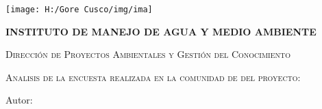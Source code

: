 \begin{titlepage}
	\centering
	{\texttt{[image: H:/Gore Cusco/img/ima]}\par}
	\vspace{1cm}
	{\bfseries\LARGE INSTITUTO DE MANEJO DE AGUA Y MEDIO AMBIENTE \par}
	\vspace{1cm}
	{\scshape\Large Dirección de Proyectos Ambientales y Gestión del Conocimiento \par}
	\vspace{1cm}
	{\scshape\Large Analisis de la encuesta realizada en la comunidad de \comunidad\- del proyecto: \par}
	\vspace{1cm}
	{\itshape\normalsize \textbf{\nombrepi} \par}
	\vfill
	{\Large Autor: \par}
	{\Large \remitente \par}
	\vfill
	{\Large \mes \- \anio \par}
\end{titlepage}